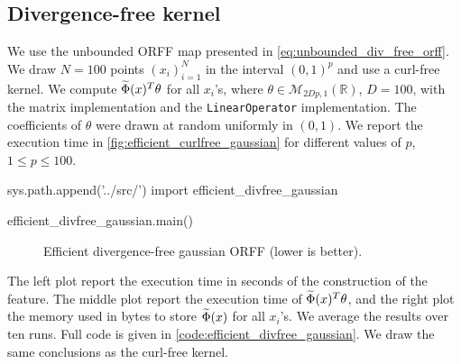 \subsection{Divergence-free kernel}
We use the unbounded \acs{ORFF} map presented in \cref{eq:unbounded_div_free_orff}. We draw $N=100$ points $(x_i)_{i=1}^N$ in the interval $(0,1)^{p}$ and use a curl-free kernel. We compute $\widetilde{\Phi}(x)^T\theta$ for all $x_i$'s, where $\theta\in\mathcal{M}_{2Dp,1}(\mathbb{R})$, $D=100$, with the matrix implementation and the \texttt{LinearOperator} implementation. The coefficients of $\theta$ were drawn at random uniformly in $(0,1)$. We report the execution time in \cref{fig:efficient_curlfree_gaussian} for different values of $p$, $1\le p\le100$.
\begin{pycode}
sys.path.append('../src/')
import efficient_divfree_gaussian

efficient_divfree_gaussian.main()
\end{pycode}
\begin{figure}[htb]
\caption[Efficient divergence-free gaussian \acs{ORFF}]{Efficient divergence-free gaussian ORFF (lower is better).}
\label{fig:efficient_divfree_gaussian}
\end{figure}
The left plot report the execution time in seconds of the construction of the feature. The middle plot report the execution time of $\widetilde{\Phi}(x)^T\theta$, and the right plot the memory used in bytes  to store $\widetilde{\Phi}(x)$ for all $x_i$'s. We average the results over ten runs. Full code is given in \cref{code:efficient_divfree_gaussian}. We draw the same conclusions as the curl-free kernel.



